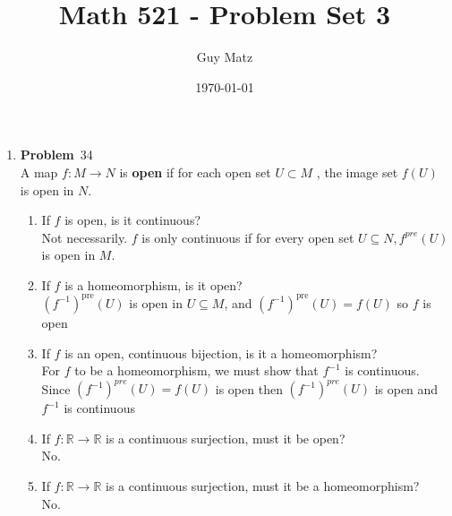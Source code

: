 \documentclass[12pt]{amsart}
\title{\textbf{Math 521 - Problem Set 3}}
\author{Guy Matz}
\date{\today}
\newcommand{\benu}{\begin{enumerate}}
\newcommand{\eenu}{\end{enumerate}}
\theoremstyle{definition}
\newcommand{\mbR}{\mathbb{R}}
\newcommand{\itep}{\item {\bfseries Problem}\ }
\begin{document}
 

\maketitle
\newpage %

\begin{enumerate}[series=p]
\itep 34 \\
A map $f:M \to N$ is \textbf{open} if for each open set $U \subset M$ , the image set $f(U)$ is open in $N$.
\\
\benu
\item If $f$ is open, is it continuous?\\
Not necessarily.  $f$ is only continuous if for every open set $U \subseteq N, f^{pre}(U)$ is open in $M$. 
\item If $f$ is a homeomorphism, is it open?\\ %
$(f^{-1})^\text{pre}(U)$ is open in $U \subseteq M$, and $(f^{-1})^\text{pre}(U) = f(U)$ so $f$ is open
\item If $f$ is an open, continuous bijection, is it a homeomorphism?\\ %
For $f$ to be a homeomorphism, we must show that $f^{-1}$ is continuous.  
Since $(f^{-1})^{pre} (U)=f(U)$ is open then $(f^{-1})^{pre} (U)$ is open and $f^{-1}$ is continuous
\item If $f : \mbR \to \mbR$ is a continuous surjection, must it be open? %
\\
No.  
\item If $f : \mbR \to \mbR$ is a continuous surjection, must it be a homeomorphism? 
\\
No.
\eenu
\begin{comment}
\textbf{Definition: Openness}\\
	A set $s \subset M$ is \textbf{open in M} if for every point $p \in S$ there is an $r \in \mbR$, $r>0$, so that for every $q \in M$,
	if $d(p,q) < r$, then $q < S$
	\begin{center}
		OR
		\\
		$\forall p \in S \, \exists r > 0 (B_r^M(p) \subseteq S)$
	\end{center}
\textbf{Definition - Continuous I}
	A function $f:M \to N$ is \textbf{continuous} if whenever $(a_i)$ is a sequence in $M$ and
	$$(a_i) \to b \text{ in } M,$$
	$$f((a_i)) \to f(b) \text{ in } N$$


\textbf{Definition - Continuous II }
	A function $f:M \to N$ is \textbf{continuous} if it satisfies the $\boldsymbol{\epsilon, \delta}$ \textbf{condition}:
	$\forall \epsilon > 0 \text{ and } \forall p \in M \, \exists \delta > 0 \text{ such that }$:
	$$q \in M \text{and } d(p,q) < \delta \implies d(fp,fq) < \epsilon$$


\end{comment}
\end{enumerate}
\end{document}
